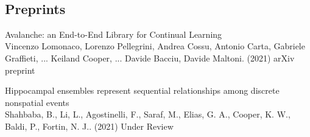 \documentclass[10pt]{cooperCV2}
\begin{document}
\needspace{\headerpush}
\myRule{\columnwidth}{1pt}\\

 
 
	

\subsection{Preprints} 
\begin{etaremune}[itemindent=-1.5\bibhang, topsep=0pt,
				   itemsep=\bibsep,partopsep=0pt,parsep=0pt,leftmargin={\bibhang+\widthof{[999]}}] 
    
    \item Avalanche: an End-to-End Library for Continual Learning \\
     Vincenzo Lomonaco, Lorenzo Pellegrini, Andrea Cossu, Antonio Carta, Gabriele Graffieti, ... Keiland Cooper, ... Davide Bacciu, Davide Maltoni. (2021) arXiv preprint 
     
	
    \item Hippocampal ensembles represent sequential relationships among discrete nonspatial events \\
     Shahbaba, B., Li, L., Agostinelli, F., Saraf, M., Elias, G. A., Cooper, K. W., Baldi, P.,  Fortin, N. J.. (2021) Under Review 
     
	

\end{etaremune}

 

	
\end{document}
